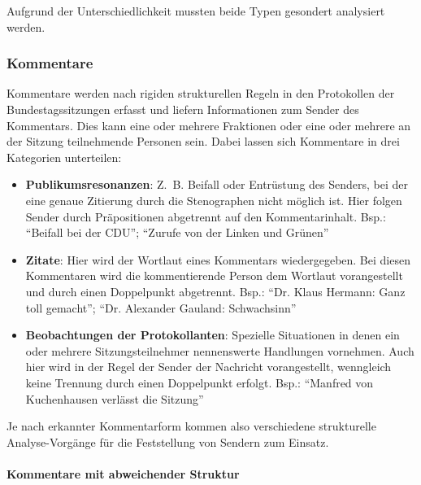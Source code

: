 Aufgrund der Unterschiedlichkeit mussten beide Typen gesondert analysiert werden.

\subsubsection{Kommentare}

Kommentare werden nach rigiden strukturellen Regeln in den Protokollen der
Bundestagssitzungen erfasst und liefern Informationen zum Sender des
Kommentars. Dies kann eine oder mehrere Fraktionen oder eine oder mehrere
an der Sitzung teilnehmende Personen sein. Dabei lassen sich Kommentare in
drei Kategorien unterteilen:

\begin{itemize}
    \item \textbf{Publikumsresonanzen}: Z.~B. Beifall oder Entrüstung des
        Senders, bei der eine genaue Zitierung durch die Stenographen nicht
        möglich ist. Hier folgen Sender durch Präpositionen abgetrennt auf
        den Kommentarinhalt. Bsp.: \enquote{Beifall bei der CDU};
        \enquote{Zurufe von der Linken und Grünen}

    \item \textbf{Zitate}: Hier wird der Wortlaut eines Kommentars
        wiedergegeben. Bei diesen Kommentaren wird die kommentierende Person
        dem Wortlaut vorangestellt und durch einen Doppelpunkt abgetrennt.
        Bsp.: \enquote{Dr. Klaus Hermann: Ganz toll gemacht}; \enquote{Dr.
        Alexander Gauland: Schwachsinn}

    \item \textbf{Beobachtungen der Protokollanten}: Spezielle Situationen in
        denen ein oder mehrere Sitzungsteilnehmer nennenswerte Handlungen
        vornehmen. Auch hier wird in der Regel der Sender der Nachricht
        vorangestellt, wenngleich keine Trennung durch einen Doppelpunkt
        erfolgt. Bsp.: \enquote{Manfred von Kuchenhausen verlässt die Sitzung}

\end{itemize}

Je nach erkannter Kommentarform kommen also verschiedene strukturelle
Analyse-Vorgänge für die Feststellung von Sendern zum Einsatz.

\paragraph{Kommentare mit abweichender Struktur}

